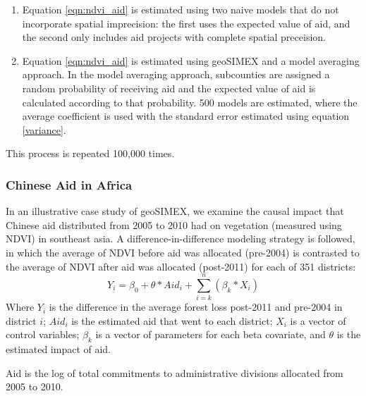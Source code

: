 \begin{enumerate}
\item Equation \ref{eqn:ndvi_aid} is estimated using two naive models that do not incorporate spatial imprecision: the first uses the expected value of aid, and the second only includes aid projects with complete spatial preceision.
\item Equation \ref{eqn:ndvi_aid} is estimated using geoSIMEX and a model averaging approach. In the model averaging approach, subcounties are assigned a random probability of receiving aid and the expected value of aid is calculated according to that probability. 500 models are estimated, where the average coefficient is used with the standard error estimated using equation \ref{variance}.
\end{enumerate}

This process is repeated 100,000 times. 

\subsubsection{Chinese Aid in Africa}
In an illustrative case study of geoSIMEX, we examine the causal impact that Chinese aid distributed from 2005 to 2010 had on vegetation (measured using NDVI) in southeast asia.  
A difference-in-difference modeling strategy is followed, in which the average of NDVI before aid was allocated (pre-2004) is contrasted to the average of NDVI after aid was allocated (post-2011) for each of 351 districts:
\begin{equation}\label{eq:caseStudy}
Y_{i} = \beta_0 + \theta * Aid_{i} + \sum_{i=k}^{n}(\beta_{k} * X_{i})
\end{equation}
Where $Y_{i}$ is the difference in the average forest loss post-2011 and pre-2004 in district $i$; $Aid_{i}$ is the estimated aid that went to each district; $X_{i}$ is a vector of control variables; $\beta_{k}$ is a vector of parameters for each beta covariate, and $\theta$ is the estimated impact of aid.











Aid is the log of total commitments to administrative divisions allocated from 2005 to 2010.

